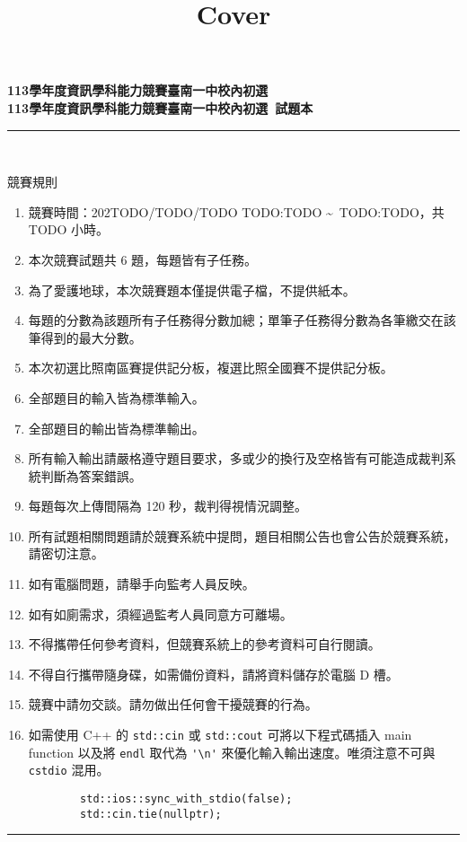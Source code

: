 \documentclass[a4paper]{article}
\title{Cover}
\begin{document}
\begin{center}
\textbf{\huge 113學年度資訊學科能力競賽臺南一中校內初選}\\
\vspace{5mm}
\textbf{\huge 113學年度資訊學科能力競賽臺南一中校內初選\ 試題本}\\
\vspace{10mm}
\rule{17cm}{2pt}\\
\vspace{5mm}

\huge 競賽規則\\
\end{center}

\fontsize{14pt}{20pt}\selectfont
\begin{enumerate}
    \setlength\itemsep{0.5pt}
    \item 競賽時間：202TODO/TODO/TODO TODO:TODO \textasciitilde \, TODO:TODO，共 TODO 小時。
    \item 本次競賽試題共 6 題，每題皆有子任務。
    \item 為了愛護地球，本次競賽題本僅提供電子檔，不提供紙本。
    \item 每題的分數為該題所有子任務得分數加總；單筆子任務得分數為各筆繳交在該筆得到的最大分數。
    \item 本次初選比照南區賽提供記分板，複選比照全國賽不提供記分板。
    \item 全部題目的輸入皆為標準輸入。
    \item 全部題目的輸出皆為標準輸出。
    \item 所有輸入輸出請嚴格遵守題目要求，多或少的換行及空格皆有可能造成裁判系統判斷為答案錯誤。
    \item 每題每次上傳間隔為 120 秒，裁判得視情況調整。
    \item 所有試題相關問題請於競賽系統中提問，題目相關公告也會公告於競賽系統，請密切注意。
    \item 如有電腦問題，請舉手向監考人員反映。
    \item 如有如廁需求，須經過監考人員同意方可離場。
    \item 不得攜帶任何參考資料，但競賽系統上的參考資料可自行閱讀。
    \item 不得自行攜帶隨身碟，如需備份資料，請將資料儲存於電腦 D 槽。
    \item 競賽中請勿交談。請勿做出任何會干擾競賽的行為。
    \item 如需使用 C++ 的 \lstinline{std::cin} 或 \lstinline{std::cout} 可將以下程式碼插入 main function 以及將 \lstinline{endl} 取代為 \lstinline{'\n'} 來優化輸入輸出速度。唯須注意不可與 \lstinline{cstdio} 混用。
        \begin{lstlisting}
        std::ios::sync_with_stdio(false);
        std::cin.tie(nullptr);
        \end{lstlisting}

\end{enumerate}

\begin{center}
\rule{17cm}{2pt}\\
\end{center}
\end{document}
